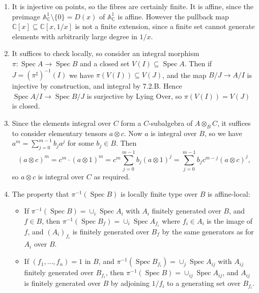 \documentclass{report}
\newcommand{\A}{\mathbb{A}}
\newcommand{\C}{\mathbb{C}}
\DeclareMathOperator{\Spec}{Spec}
\begin{document}
\begin{enumerate}[label=\textbf{7.3.\Alph*.}]
	\item It is injective on points, so the fibres are certainly finite. It is
	      affine, since the preimage $\A^1_\C\setminus\{0\}=D(x)$ of $\A^1_\C$
	      is affine. However the pullback map $\C[x]\subseteq\C[x,1/x]$ is not
	      a finite extension, since a finite set cannot generate elements with
	      arbitrarily large degree in $1/x$.

	\item It suffices to check locally, so consider an integral morphism
	      $\pi:\Spec A\to\Spec B$ and a closed set $V(I)\subseteq\Spec A$. Then
	      if $J=(\pi^\sharp)^{-1}(I)$ we have $\pi(V(I))\subseteq V(J)$, and the
	      map $B/J\to A/I$ is injective by construction, and integral by 7.2.B.
	      Hence $\Spec A/I\to\Spec B/J$ is surjective by Lying Over, so
	      $\pi(V(I))=V(J)$ is closed.

	\item Since the elements integral over $C$ form a $C$-subalgebra of
	      $A\otimes_BC$, it suffices to consider elementary tensors $a\otimes c$.
	      Now $a$ is integral over $B$, so we have $a^m=\sum_{j=0}^{m-1}b_ja^j$
	      for some $b_j\in B$. Then
	      \begin{equation*}
		      (a\otimes c)^m
		      = c^m\cdot(a\otimes 1)^m
		      = c^m\sum_{j=0}^{m-1}b_j(a\otimes 1)^j
		      = \sum_{j=0}^{m-1}b_jc^{m-j}(a\otimes c)^j,
	      \end{equation*}
	      so $a\otimes c$ is integral over $C$ as required.

	\item The property that $\pi^{-1}(\Spec B)$ is locally finite type over
	      $B$ is affine-local:
	      \begin{itemize}
		      \item If $\pi^{-1}(\Spec B)=\cup_i\Spec A_i$ with $A_i$ finitely
		            generated over $B$, and $f\in B$, then
		            $\pi^{-1}(\Spec B_f)=\cup_i\Spec A_{f_i}$ where $f_i\in A_i$
		            is the image  of $f$, and $(A_i)_{f_i}$ is finitely generated
		            over $B_f$ by the same generators as for $A_i$ over $B$.

		      \item If $(f_1,\ldots,f_n)=1$ in $B$, and
		            $\pi^{-1}(\Spec B_{f_i})=\cup_j\Spec A_{ij}$ with $A_{ij}$
		            finitely generated over $B_{f_i}$, then
		            $\pi^{-1}(\Spec B)=\cup_{ij}\Spec A_{ij}$, and $A_{ij}$ is
		            finitely generated over $B$ by adjoining $1/f_i$ to a
		            generating set over $B_{f_i}$.
	      \end{itemize}


\end{enumerate}
\end{document}
